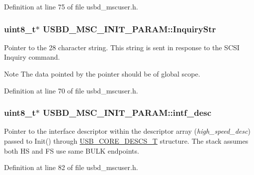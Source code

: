 Definition at line 75 of file usbd\+\_\+mscuser.\+h.

\subsubsection[{\texorpdfstring{Inquiry\+Str}{InquiryStr}}]{\setlength{\rightskip}{0pt plus 5cm}uint8\+\_\+t$\ast$ U\+S\+B\+D\+\_\+\+M\+S\+C\+\_\+\+I\+N\+I\+T\+\_\+\+P\+A\+R\+A\+M\+::\+Inquiry\+Str}\hypertarget{structUSBD__MSC__INIT__PARAM_a84e110f5e1d448f9c35e9e8583429df8}{}\label{structUSBD__MSC__INIT__PARAM_a84e110f5e1d448f9c35e9e8583429df8}
Pointer to the 28 character string. This string is sent in response to the S\+C\+SI Inquiry command. \begin{DoxyNote}{Note}
The data pointed by the pointer should be of global scope. 
\end{DoxyNote}


Definition at line 70 of file usbd\+\_\+mscuser.\+h.

\subsubsection[{\texorpdfstring{intf\+\_\+desc}{intf_desc}}]{\setlength{\rightskip}{0pt plus 5cm}uint8\+\_\+t$\ast$ U\+S\+B\+D\+\_\+\+M\+S\+C\+\_\+\+I\+N\+I\+T\+\_\+\+P\+A\+R\+A\+M\+::intf\+\_\+desc}\hypertarget{structUSBD__MSC__INIT__PARAM_a308fc23cd32876dcdc914d2223f8f7c4}{}\label{structUSBD__MSC__INIT__PARAM_a308fc23cd32876dcdc914d2223f8f7c4}
Pointer to the interface descriptor within the descriptor array ({\itshape high\+\_\+speed\+\_\+desc}) passed to Init() through \hyperlink{group__USBD__Core_gabdc617d119eac0555f91bea957c41ecc}{U\+S\+B\+\_\+\+C\+O\+R\+E\+\_\+\+D\+E\+S\+C\+S\+\_\+T} structure. The stack assumes both HS and FS use same B\+U\+LK endpoints. 

Definition at line 82 of file usbd\+\_\+mscuser.\+h.

